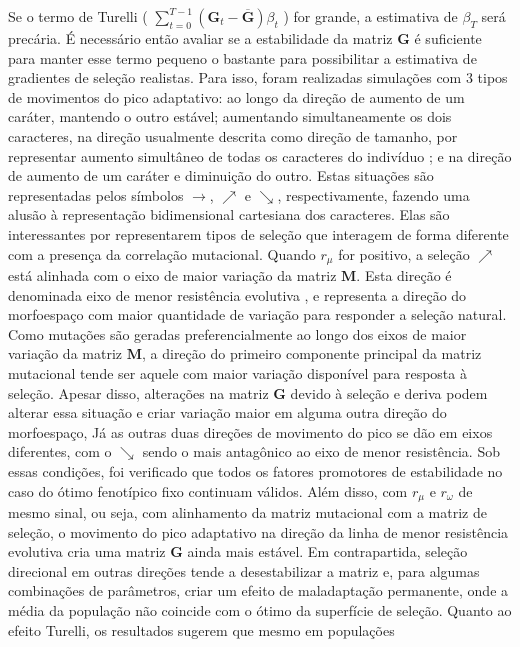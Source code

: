 Se o termo de Turelli ( $\sum_{t=0}^{T-1} (\mathbf{G}_t - \overline {\mathbf{G}})
\beta_t$ ) for grande, a estimativa de $\beta_T$ será precária.
É necessário então avaliar se a estabilidade da matriz $\mathbf{G}$ é suficiente
para manter esse termo pequeno o bastante para possibilitar a
estimativa de gradientes de seleção realistas.
Para isso, foram realizadas simulações com 3 tipos de movimentos do pico
adaptativo: ao longo da direção de aumento de um caráter, mantendo o outro
estável; aumentando simultaneamente os dois caracteres, na direção usualmente
descrita como direção de tamanho, por representar aumento simultâneo de
todas os caracteres do indivíduo \citep{Marroig2005}; e na direção de
aumento de um caráter e diminuição do outro.
Estas situações são representadas pelos símbolos $\rightarrow$,
$\nearrow$ e $\searrow$, respectivamente, fazendo uma alusão à
representação bidimensional cartesiana dos caracteres.
Elas são interessantes por representarem tipos de seleção que interagem
de forma diferente com a presença da correlação mutacional.
Quando $r_\mu$ for positivo, a seleção $\nearrow$ está alinhada com o
eixo de maior variação da matriz $\mathbf{M}$.
Esta direção é denominada eixo de menor resistência evolutiva
\citep{Schluter1996}, e  representa a direção do morfoespaço com maior
quantidade de variação para responder a seleção natural.
Como mutações são geradas preferencialmente ao longo dos eixos de maior
variação da matriz $\mathbf{M}$, a direção do primeiro componente
principal da matriz mutacional tende ser aquele com maior variação
disponível para resposta à seleção.
Apesar disso, alterações na matriz $\mathbf{G}$ devido à seleção e
deriva podem alterar essa situação e criar variação maior em alguma
outra direção do morfoespaço, 
Já as outras duas direções de movimento do pico se dão em eixos
diferentes, com o $\searrow$ sendo o mais antagônico ao eixo de menor
resistência.
Sob essas condições, foi verificado que todos os fatores promotores de
estabilidade no caso do ótimo fenotípico fixo continuam válidos.
Além disso, com $r_\mu$ e $r_\omega$ de mesmo sinal, ou seja, com
alinhamento da matriz mutacional com a matriz de seleção, o movimento
do pico adaptativo na direção da linha de menor resistência evolutiva
cria uma matriz $\mathbf{G}$ ainda mais estável.
Em contrapartida, seleção direcional em outras direções tende a
desestabilizar a matriz e, para algumas combinações de parâmetros, criar
um efeito de maladaptação permanente, onde a média da população não
coincide com o ótimo da superfície de seleção.
Quanto ao efeito Turelli, os resultados sugerem que mesmo em populações
